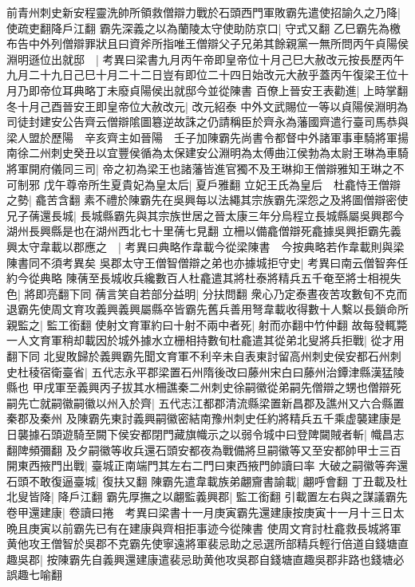 前青州刺史新安程靈洗帥所領救僧辯力戰於石頭西門軍敗霸先遣使招諭久之乃降|{
	使疏吏翻降戶江翻}
霸先深義之以為蘭陵太守使助防京口|{
	守式又翻}
乙巳霸先為檄布告中外列僧辯罪狀且曰資斧所指唯王僧辯父子兄弟其餘親黨一無所問丙午貞陽侯淵明遜位出就邸　|{
	考異曰梁書九月丙午帝即皇帝位十月己巳大赦改元按長歷丙午九月二十九日己巳十月二十二日豈有即位二十四日始改元大赦乎蓋丙午復梁王位十月乃即帝位耳典略丁未廢貞陽侯出就邸今並從陳書}
百僚上晉安王表勸進|{
	上時掌翻}
冬十月己酉晉安王即皇帝位大赦改元|{
	改元紹泰}
中外文武賜位一等以貞陽侯淵明為司徒封建安公告齊云僧辯隂圖簒逆故誅之仍請稱臣於齊永為藩國齊遣行臺司馬恭與梁人盟於歷陽　辛亥齊主如晉陽　壬子加陳霸先尚書令都督中外諸軍事車騎將軍揚南徐二州刺史癸丑以宜豐侯循為太保建安公淵明為太傅曲江侯勃為太尉王琳為車騎將軍開府儀同三司|{
	帝之初為梁王也諸藩皆進官獨不及王琳抑王僧辯雅知王琳之不可制邪}
戊午尊帝所生夏貴妃為皇太后|{
	夏戶雅翻}
立妃王氏為皇后　杜龕恃王僧辯之勢|{
	龕苦含翻}
素不禮於陳霸先在吳興每以法繩其宗族霸先深怨之及將圖僧辯密使兄子蒨還長城|{
	長城縣霸先與其宗族世居之晉太康三年分烏程立長城縣屬吳興郡今湖州長興縣是也在湖州西北七十里蒨七見翻}
立柵以備龕僧辯死龕據吳興拒霸先義興太守韋載以郡應之　|{
	考異曰典略作韋載今從梁陳書　今按典略若作韋載則與梁陳書同不須考異矣}
吳郡太守王僧智僧辯之弟也亦據城拒守史|{
	考異曰南云僧智奔任約今從典略}
陳蒨至長城收兵纔數百人杜龕遣其將杜泰將精兵五千奄至將士相視失色|{
	將即亮翻下同}
蒨言笑自若部分益明|{
	分扶問翻}
衆心乃定泰晝夜苦攻數旬不克而退霸先使周文育攻義興義興屬縣卒皆霸先舊兵善用弩韋載收得數十人繫以長鎖命所親監之|{
	監工銜翻}
使射文育軍約曰十射不兩中者死|{
	射而亦翻中竹仲翻}
故每發輒斃一人文育軍稍却載因於城外據水立栅相持數旬杜龕遣其從弟北叟將兵拒戰|{
	從才用翻下同}
北叟敗歸於義興霸先聞文育軍不利辛未自表東討留高州刺史侯安都石州刺史杜稜宿衛臺省|{
	五代志永平郡梁置石州隋後改曰藤州宋白曰藤州治鐔津縣漢猛陵縣也}
甲戌軍至義興丙子拔其水柵譙秦二州刺史徐嗣徽從弟嗣先僧辯之甥也僧辯死嗣先亡就嗣徽嗣徽以州入於齊|{
	五代志江都郡清流縣梁置新昌郡及譙州又六合縣置秦郡及秦州}
及陳霸先東討義興嗣徽密結南豫州刺史任約將精兵五千乘虚襲建康是日襲據石頭遊騎至闕下侯安都閉門藏旗幟示之以弱令城中曰登陴闚賊者斬|{
	幟昌志翻陴頻彌翻}
及夕嗣徽等收兵還石頭安都夜為戰備將旦嗣徽等又至安都帥甲士三百開東西掖門出戰|{
	臺城正南端門其左右二門曰東西掖門帥讀曰率}
大破之嗣徽等奔還石頭不敢復逼臺城|{
	復扶又翻}
陳霸先遣韋載族弟翽齎書諭載|{
	翽呼會翻}
丁丑載及杜北叟皆降|{
	降戶江翻}
霸先厚撫之以翽監義興郡|{
	監工銜翻}
引載置左右與之謀議霸先卷甲還建康|{
	卷讀曰捲　考異曰梁書十一月庚寅霸先還建康按庚寅十一月十三日太晩且庚寅以前霸先已有在建康與齊相拒事迹今從陳書}
使周文育討杜龕救長城將軍黄他攻王僧智於吳郡不克霸先使寧遠將軍裴忌助之忌選所部精兵輕行倍道自錢塘直趣吳郡|{
	按陳霸先自義興還建康遣裴忌助黄他攻吳郡自錢塘直趣吳郡非路也錢塘必誤趣七喻翻}

